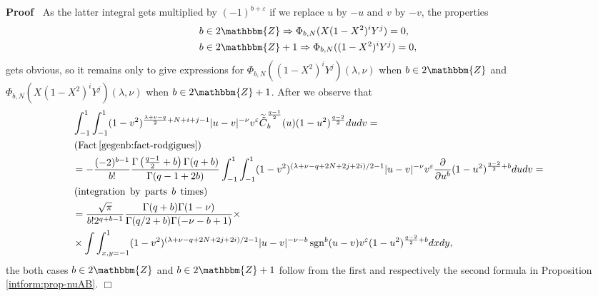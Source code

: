 \documentclass{article}
\newcommand{\tmop}[1]{\ensuremath{\operatorname{#1}}}
\renewenvironment{proof}{\noindent\textbf{Proof\ }}{\hspace*{\fill}$\Box$\medskip}
\theoremstyle{remark}
\begin{document}
\begin{proof}
  As the latter integral gets multiplied by $(- 1)^{b + \varepsilon}$ if we
  replace $u$ by $- u$ and $v$ by $- v$, the properties
  \begin{eqnarray}
    & b \in 2\mathbbm{Z} \Rightarrow \Phi_{b, N} (X (1 - X^2)^i Y^j) = 0, & 
    \nonumber\\
    & b \in 2\mathbbm{Z}+ 1 \Rightarrow \Phi_{b, N} ((1 - X^2)^i Y^j) = 0, & 
    \nonumber
  \end{eqnarray}
  gets obvious, so it remains only to give expressions for $\Phi_{b, N} ((1 -
  X^2)^i Y^j) (\lambda, \nu)$ when $b \in 2\mathbbm{Z}$ and $\Phi_{b, N} (X (1
  - X^2)^i Y^j) (\lambda, \nu)$ when $b \in 2\mathbbm{Z}+ 1$. After we observe
  that
  \begin{eqnarray}
    & \int_{- 1}^1 \int_{- 1}^1 (1 - v^2)^{\frac{\lambda + \nu - q}{2} + N +
    i + j - 1} | u - v |^{- \nu} v^{\varepsilon}
    \widetilde{\tilde{C}}^{\frac{q - 1}{2}}_b (u) (1 - u^2)^{\frac{q - 2}{2}}
    d u d v = &  \nonumber\\
    & \left( \tmop{Fact} \ref{gegenb:fact-rodgigues} \right) &  \nonumber\\
    & = - \frac{(- 2)^{b - 1}}{b!} \frac{\Gamma \left( \frac{q - 1}{2} + b
    \right) \Gamma (q + b)}{\Gamma (q - 1 + 2 b)} \int^1_{- 1} \int_{- 1}^1 (1
    - v^2)^{(\lambda + \nu - q + 2 N + 2 j + 2 i) / 2 - 1} | u - v |^{- \nu}
    v^{\varepsilon} \frac{\partial}{\partial u^b} (1 - u^2)^{\frac{q - 2}{2} +
    b} d u d v = &  \nonumber\\
    & \left( \tmop{integration} \; \tmop{by} \; \tmop{parts} \; b \;
    \tmop{times} \right) &  \nonumber\\
    & = \frac{\sqrt{\pi}}{b! 2^{q + b - 1}} \frac{\Gamma (q + b) \Gamma (1 -
    \nu)}{\Gamma (q / 2 + b) \Gamma (- \nu - b + 1)} \times &  \nonumber\\
    & \times \int \int_{x, y = - 1}^1 (1 - v^2)^{(\lambda + \nu - q + 2 N + 2
    j + 2 i) / 2 - 1} | u - v |^{- \nu - b} \tmop{sgn}^b (u - v)
    v^{\varepsilon} (1 - u^2)^{\frac{q - 2}{2} + b} d x d y, &  \nonumber
  \end{eqnarray}
  the both cases $b \in 2\mathbbm{Z}$ and $b \in 2\mathbbm{Z}+ 1$ follow from
  the first and respectively the second formula in Proposition
  \ref{intform:prop-nuAB}.
\end{proof}
\end{document}

